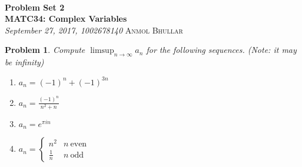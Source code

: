 \documentclass[12pt]{article}
\renewcommand{\=}[1]{\stackrel{#1}{=}} %
\newtheorem{p}{Problem}[section]
\theoremstyle{definition}
\begin{document}
{\noindent\Huge\bf  \\[0.5\baselineskip] {\selectfont  %
Problem Set 2}         }\\[2\baselineskip] %
{ {\bf {}\selectfont MATC34: Complex Variables}\\ {\textit{%
\selectfont September 27, 2017, 1002678140}}}
{\large \textsc{Anmol Bhullar}} %
\\[1.4\baselineskip]

\begin{p}
    Compute $\limsup_{n\to\infty}a_n$ for the following sequences. (Note: it may be infinity)
    \begin{enumerate}
        \item $a_n = (-1)^n + (-1)^{3n}$
        \item $a_n = \frac{(-1)^n}{n^2+n}$
        \item $a_n = e^{\pi in}$
        \item $a_n = \begin{cases} n^2 & n\: \text{even} \\ \frac{1}{n} & n\: \text{odd} \end{cases}$
    \end{enumerate}
\end{p}
\end{document}
